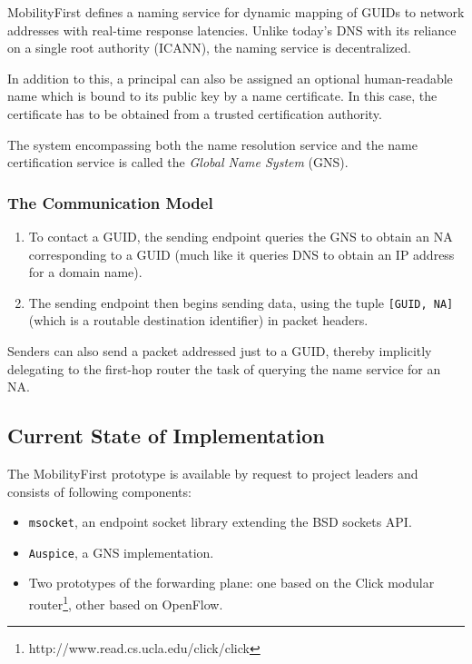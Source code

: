                 MobilityFirst defines a naming service for dynamic mapping of GUIDs to network addresses with real-time response latencies. Unlike today's DNS with its reliance on a single root authority (ICANN), the naming service is decentralized.

                In addition to this, a principal can also be assigned an optional human-readable name which is bound to its public key by a name certificate. In this case, the certificate has to be obtained from a trusted certification authority.

                The system encompassing both the name resolution service and the name certification service is called the \emph{Global Name System} (GNS).

            \subsubsection{The Communication Model}

                \begin{enumerate}
                    \item To contact a GUID, the sending endpoint queries the GNS to obtain an NA corresponding to a GUID (much like it queries DNS to obtain an IP address for a domain name).
                    \item The sending endpoint then begins sending data, using the tuple \texttt{[GUID, NA]} (which is a routable destination identifier) in packet headers.
                \end{enumerate}

                Senders can also send a packet addressed just to a GUID, thereby implicitly delegating to the first-hop router the task of querying the name service for an NA.

        \subsection{Current State of Implementation}

            The MobilityFirst prototype is available by request to project leaders and consists of following components:

            \begin{itemize}
                \item \texttt{msocket}, an endpoint socket library extending the BSD sockets API.
                \item \texttt{Auspice}, a GNS implementation.
                \item Two prototypes of the forwarding plane: one based on the Click modular router\footnote{http://www.read.cs.ucla.edu/click/click}, other based on OpenFlow.
            \end{itemize}

